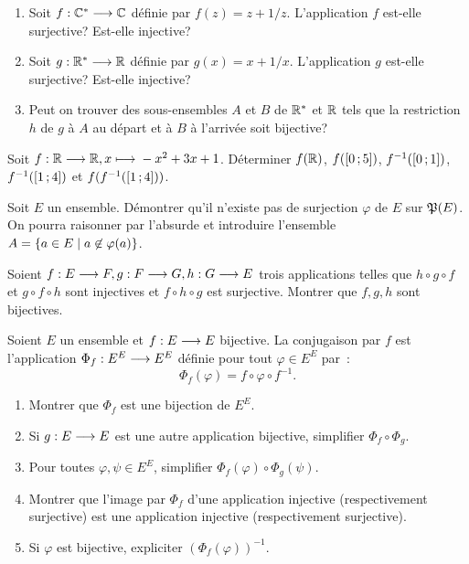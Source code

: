 \begin{exercice}
  \begin{enumerate}
    \item Soit \(f:\mathbb{C}^* \longrightarrow{} \mathbb{C}\) définie par \(f(z) = z+1/z\).
      L'application \(f\) est-elle surjective? Est-elle injective?
    \item Soit \(g:\mathbb{R}^* \longrightarrow{} \mathbb{R}\) définie par \(g(x) = x+1/x\).
      L'application \(g\) est-elle surjective? Est-elle injective?
    \item Peut on trouver des sous-ensembles \(A\) et \(B\) de \(\mathbb{R}^*\) et
      \(\mathbb{R}\) tels que la restriction \(h\) de \(g\) à \(A\) au départ et à
      \(B\) à l'arrivée soit bijective?
  \end{enumerate}
\end{exercice}

\begin{exercice}
  Soit \(f:\mathbb{R} \longrightarrow{} \mathbb{R}, x \longmapsto{} -x^2+3x+1\). Déterminer \(f(\mathbb{R})\),
  \(f(\left[ 0 \, ; {} 5 \right])\), \(f^{-1}(\left[ 0 \, ; {} 1 \right])\),
  \(f^{-1}(\left[ 1 \, ; {} 4 \right])\) et \(f(f^{-1}(\left[ 1 \, ; {} 4 \right]))\).
\end{exercice}

\begin{exercice}
  Soit \(E\) un ensemble. Démontrer qu'il n'existe pas de surjection
  \(\varphi\) de \(E\) sur \(\mathfrak{P}(E)\). On pourra raisonner par l'absurde et
  introduire l'ensemble \(A = \left\{a \in{}E\mathrel{}\middle|\mathrel{}a \not\in{}\varphi(a)\right\}\).
\end{exercice}

\begin{exercice}
  Soient \(f:E \longrightarrow{} F, g:F \longrightarrow{} G, h:G \longrightarrow{} E\)
  trois applications telles que \(h \circ g \circ f\) et \(g \circ f \circ h\)
  sont injectives et \(f \circ h \circ g\) est surjective. Montrer que \(f, g,
  h\) sont bijectives.
\end{exercice}

\begin{exercice}[Conjugaison]
  Soient \(E\) un ensemble et \(f:E \longrightarrow{} E\) bijective. La
  conjugaison par \(f\) est l'application \(\Phi_f:E^E \longrightarrow{} E^E\)
  définie pour tout \(\varphi \in{}E^E\) par~:
  \begin{equation}
    \Phi_f(\varphi) = f \circ \varphi \circ f^{-1}.
  \end{equation}
  \begin{enumerate}
    \item Montrer que \(\Phi_f\) est une bijection de \(E^E\).
    \item Si \(g:E \longrightarrow{} E\) est une autre application bijective,
      simplifier \(\Phi_f \circ \Phi_g\).
    \item Pour toutes \(\varphi, \psi \in{}E^E\), simplifier
      \(\Phi_f(\varphi) \circ \Phi_g(\psi)\).
    \item Montrer que l'image par \(\Phi_f\) d'une application injective
      (respectivement surjective) est une application injective
      (respectivement surjective).
    \item Si \(\varphi\) est bijective, expliciter \({({\Phi}_f(\varphi))}^{-1}\).
  \end{enumerate}
\end{exercice}

